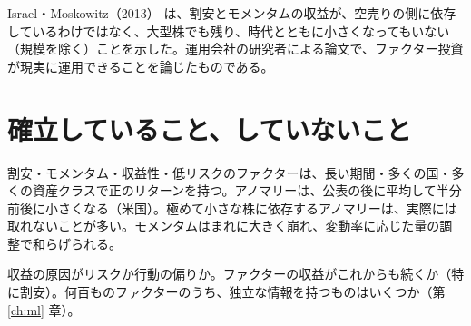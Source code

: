 Israel・Moskowitz（2013）\cite{israelmoskowitz2013} は、割安とモメンタムの収益が、空売りの側に依存しているわけではなく、大型株でも残り、時代とともに小さくなってもいない（規模を除く）ことを示した。運用会社の研究者による論文で、ファクター投資が現実に運用できることを論じたものである。

\section{確立していること、していないこと}

\begin{keybox}[まとめ]
\begin{description}[leftmargin=1em,style=nextline]
\item[確立している]
  割安・モメンタム・収益性・低リスクのファクターは、長い期間・多くの国・多くの資産クラスで正のリターンを持つ。アノマリーは、公表の後に平均して半分前後に小さくなる（米国）。極めて小さな株に依存するアノマリーは、実際には取れないことが多い。モメンタムはまれに大きく崩れ、変動率に応じた量の調整で和らげられる。
\item[議論が続いている]
  収益の原因がリスクか行動の偏りか。ファクターの収益がこれからも続くか（特に割安）。何百ものファクターのうち、独立な情報を持つものはいくつか（第 \ref{ch:ml} 章）。
\end{description}
\end{keybox}
